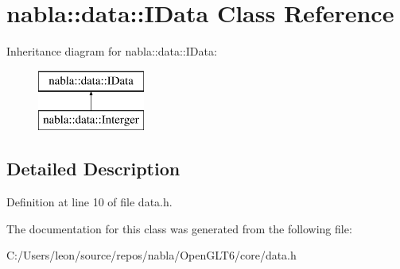 \hypertarget{classnabla_1_1data_1_1_i_data}{}\section{nabla\+::data\+::I\+Data Class Reference}
\label{classnabla_1_1data_1_1_i_data}
Inheritance diagram for nabla\+::data\+::I\+Data\+:\begin{figure}[H]
\begin{center}
\leavevmode
\includegraphics[height=2.000000cm]{classnabla_1_1data_1_1_i_data}
\end{center}
\end{figure}


\subsection{Detailed Description}


Definition at line 10 of file data.\+h.



The documentation for this class was generated from the following file\+:\begin{DoxyCompactItemize}
\item 
C\+:/\+Users/leon/source/repos/nabla/\+Open\+G\+L\+T6/core/data.\+h\end{DoxyCompactItemize}
